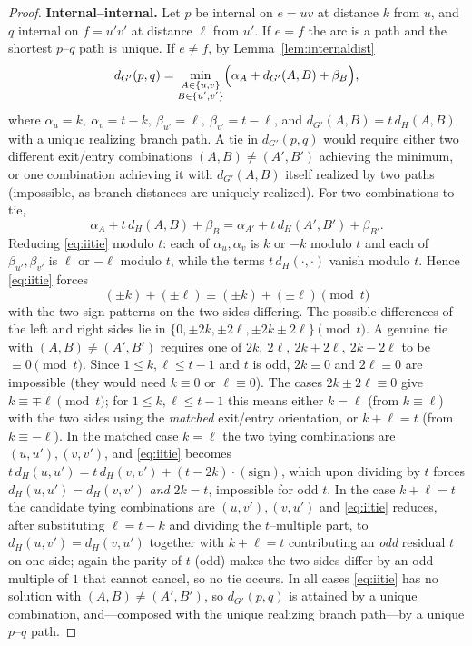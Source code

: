 \documentclass{amsart}
\theoremstyle{plain}
\theoremstyle{definition}
\newcommand{\dG}{d_{G'}}
\newcommand{\dH}{d_{H}}
\begin{document}
\begin{proof}
\textbf{Internal--internal.} Let $p$ be internal on $e=uv$ at distance $k$ from $u$,
and $q$ internal on $f=u'v'$ at distance $\ell$ from $u'$. If $e=f$ the arc is a path
and the shortest $p$--$q$ path is unique. If $e\ne f$, by Lemma~\ref{lem:internaldist}
\[
\dG(p,q)=\min_{\substack{A\in\{u,v\}\\ B\in\{u',v'\}}}
\Bigl(\alpha_A+\dG(A,B)+\beta_B\Bigr),
\]
where $\alpha_u=k,\ \alpha_v=t-k,\ \beta_{u'}=\ell,\ \beta_{v'}=t-\ell$, and
$\dG(A,B)=t\,\dH(A,B)$ with a unique realizing branch path. A tie in $\dG(p,q)$ would
require either two different exit/entry combinations $(A,B)\ne(A',B')$ achieving the
minimum, or one combination achieving it with $\dG(A,B)$ itself realized by two paths
(impossible, as branch distances are uniquely realized). For two combinations to tie,
\begin{equation}\label{eq:iitie}
\alpha_A+t\,\dH(A,B)+\beta_B=\alpha_{A'}+t\,\dH(A',B')+\beta_{B'}.
\end{equation}
Reducing \eqref{eq:iitie} modulo $t$: each of $\alpha_u,\alpha_v$ is $k$ or $-k$
modulo $t$ and each of $\beta_{u'},\beta_{v'}$ is $\ell$ or $-\ell$ modulo $t$, while
the terms $t\,\dH(\cdot,\cdot)$ vanish modulo $t$. Hence \eqref{eq:iitie} forces
\[
(\pm k)+(\pm \ell)\equiv(\pm k)+(\pm\ell)\pmod t
\]
with the two sign patterns on the two sides differing. The possible differences of
the left and right sides lie in $\{0,\pm2k,\pm2\ell,\pm2k\pm2\ell\}\pmod t$. A
genuine tie with $(A,B)\ne(A',B')$ requires one of $2k,\ 2\ell,\ 2k+2\ell,\ 2k-2\ell$
to be $\equiv0\pmod t$. Since $1\le k,\ell\le t-1$ and $t$ is odd, $2k\equiv0$ and
$2\ell\equiv0$ are impossible (they would need $k\equiv0$ or $\ell\equiv0$). The
cases $2k\pm2\ell\equiv0$ give $k\equiv\mp\ell\pmod t$; for $1\le k,\ell\le t-1$ this
means either $k=\ell$ (from $k\equiv\ell$) with the two sides using the
\emph{matched} exit/entry orientation, or $k+\ell=t$ (from $k\equiv-\ell$). In the
matched case $k=\ell$ the two tying combinations are $(u,u'),(v,v')$, and
\eqref{eq:iitie} becomes $t\,\dH(u,u')=t\,\dH(v,v')+ (t-2k)\cdot(\text{sign})$, which
upon dividing by $t$ forces $\dH(u,u')=\dH(v,v')$ \emph{and} $2k=t$, impossible for
odd $t$. In the case $k+\ell=t$ the candidate tying combinations are $(u,v'),(v,u')$
and \eqref{eq:iitie} reduces, after substituting $\ell=t-k$ and dividing the
$t$--multiple part, to $\dH(u,v')=\dH(v,u')$ together with $k+\ell=t$ contributing an
\emph{odd} residual $t$ on one side; again the parity of $t$ (odd) makes the two
sides differ by an odd multiple of $1$ that cannot cancel, so no tie occurs. In all
cases \eqref{eq:iitie} has no solution with $(A,B)\ne(A',B')$, so $\dG(p,q)$ is
attained by a unique combination, and—composed with the unique realizing branch
path—by a unique $p$--$q$ path.


\end{proof}
\end{document}
